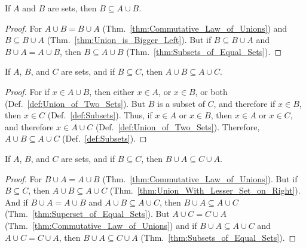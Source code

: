         \begin{theorem}
            \label{thm:Union_is_Bigger_Right}%
            If $A$ and $B$ are sets, then $B\subseteq{A}\cup{B}$.
        \end{theorem}
        \begin{proof}
            For $A\cup{B}=B\cup{A}$ (Thm.~\ref{thm:Commutative_Law_of_Unions})
            and $B\subseteq{B}\cup{A}$ (Thm.~\ref{thm:Union_is_Bigger_Left}).
            But if $B\subseteq{B}\cup{A}$ and $B\cup{A}=A\cup{B}$, then
            $B\subseteq{A}\cup{B}$ (Thm.~\ref{thm:Subsets_of_Equal_Sets}).
        \end{proof}
        \begin{theorem}
            \label{thm:Union_With_Lesser_Set_on_Right}%
            If $A$, $B$, and $C$ are sets, and if $B\subseteq{C}$, then
            $A\cup{B}\subseteq{A}\cup{C}$.
        \end{theorem}
        \begin{proof}
            For if $x\in{A}\cup{B}$, then either $x\in{A}$, or $x\in{B}$, or
            both (Def.~\ref{def:Union_of_Two_Sets}). But $B$ is a subset of $C$,
            and therefore if $x\in{B}$, then $x\in{C}$ (Def.~\ref{def:Subsets}).
            Thus, if $x\in{A}$ or $x\in{B}$, then $x\in{A}$ or $x\in{C}$, and
            therefore $x\in{A}\cup{C}$ (Def.~\ref{def:Union_of_Two_Sets}).
            Therefore, $A\cup{B}\subseteq{A}\cup{C}$ (Def.~\ref{def:Subsets}).
        \end{proof}
        \begin{theorem}
            \label{thm:Union_With_Lesser_Set_on_Left}%
            If $A$, $B$, and $C$ are sets, and if $B\subseteq{C}$, then
            $B\cup{A}\subseteq{C}\cup{A}$.
        \end{theorem}
        \begin{proof}
            For $B\cup{A}=A\cup{B}$ (Thm.~\ref{thm:Commutative_Law_of_Unions}).
            But if $B\subseteq{C}$, then $A\cup{B}\subseteq{A}\cup{C}$
            (Thm.~\ref{thm:Union_With_Lesser_Set_on_Right}). And if
            $B\cup{A}=A\cup{B}$ and $A\cup{B}\subseteq{A}\cup{C}$, then
            $B\cup{A}\subseteq{A}\cup{C}$
            (Thm.~\ref{thm:Superset_of_Equal_Sets}). But $A\cup{C}=C\cup{A}$
            (Thm.~\ref{thm:Commutative_Law_of_Unions}) and if
            $B\cup{A}\subseteq{A}\cup{C}$ and $A\cup{C}=C\cup{A}$, then
            $B\cup{A}\subseteq{C}\cup{A}$
            (Thm.~\ref{thm:Subsets_of_Equal_Sets}).
        \end{proof}
